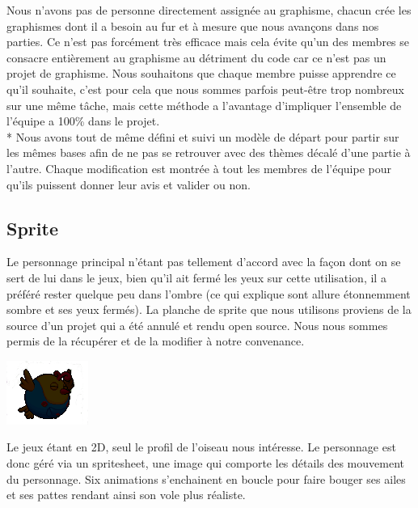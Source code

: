 \documentclass [11pt]{report}
\begin{document}
	\indent Nous n'avons pas de personne directement assignée au graphisme, chacun crée les graphismes dont il a besoin au fur et à mesure que nous avançons dans nos parties. Ce n'est pas forcément très efficace mais cela évite qu'un des membres se consacre entièrement au graphisme au détriment du code car ce n'est pas un projet de graphisme. Nous souhaitons que chaque membre puisse apprendre ce qu'il souhaite, c'est pour cela que nous sommes parfois peut-être trop nombreux sur une même tâche, mais cette méthode a l'avantage d'impliquer l'ensemble de l'équipe a 100\% dans le projet.\\*
	\indent Nous avons tout de même défini et suivi un modèle de départ pour partir sur les mêmes bases afin de ne pas se retrouver avec des thèmes décalé d'une partie à l'autre. Chaque modification est montrée à tout les membres de l'équipe pour qu'ils puissent donner leur avis et valider ou non.
	
	\vspace{15mm}
	
	\subsection {Sprite}
	Le personnage principal n'étant pas tellement d'accord avec la façon dont on se sert de lui dans le jeux, bien qu'il ait fermé les yeux sur cette utilisation, il a préféré rester quelque peu dans l'ombre (ce qui explique sont allure étonnemment sombre et ses yeux fermés).
	La planche de sprite que nous utilisons proviens de la source d'un projet qui a été annulé et rendu open source. Nous nous sommes permis de la récupérer et de la modifier à notre convenance.
	
	\vspace{4mm}
		
		\begin{center}
		\includegraphics[scale=0.5]{images/bird.png}
		\end{center}
		
	\vspace{10mm}
		
	Le jeux étant en 2D, seul le profil de l'oiseau nous intéresse. Le personnage est donc géré via un spritesheet, une image qui comporte les détails des mouvement du personnage. Six animations s'enchainent en boucle pour faire bouger ses ailes et ses pattes rendant ainsi son vole plus réaliste.
	
\end{document}
